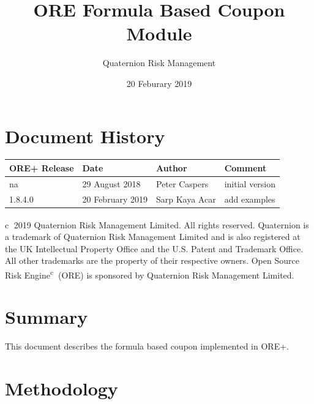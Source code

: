 \documentclass[12pt, a4paper]{article}
\begin{document}
\title{ORE Formula Based Coupon Module}
\author{Quaternion Risk Management}
\date{20 Feburary 2019}
\maketitle

\newpage

\section*{Document History}

\begin{center}
\begin{supertabular}{|l|l|l|p{7cm}|}
\hline
ORE+ Release & Date & Author & Comment \\
\hline
na & 29 August 2018  & Peter Caspers& initial version\\
1.8.4.0 & 20 February 2019 & Sarp Kaya Acar & add examples \\
\hline
\end{supertabular}
\end{center}

\vspace{3cm}

\newpage

\tableofcontents
\vfill

\textcircled{c} 2019 Quaternion Risk Management Limited.  All rights reserved.
Quaternion\textsuperscript{\textregistered} is a trademark of Quaternion Risk Management Limited and is also registered
at the UK Intellectual Property Office and the U.S. Patent and Trademark Office.  All other trademarks are the property
of their respective owners. Open Source Risk Engine\textsuperscript{\textcircled{c}} (ORE) is sponsored by Quaternion
Risk Management Limited.

\newpage



\section{Summary}

This document describes the formula based coupon implemented in ORE+.



\section{Methodology}
\label{ssection_FormulaBasedLeg}
\end{document}
